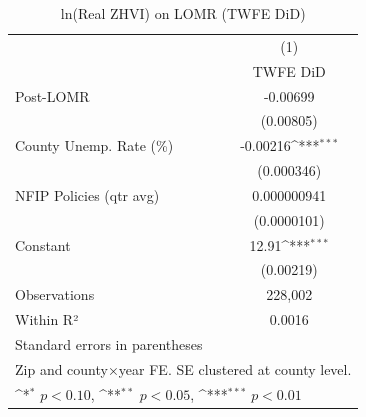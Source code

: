 \begin{table}[htbp]\centering
\def\sym#1{\ifmmode^{#1}\else\(^{#1}\)\fi}
\caption{ln(Real ZHVI) on LOMR (TWFE DiD)}
\begin{tabular}{l*{1}{c}}
\hline\hline
                    &\multicolumn{1}{c}{(1)}\\
                    &\multicolumn{1}{c}{TWFE DiD}\\
\hline
Post-LOMR           &    -0.00699         \\
                    &   (0.00805)         \\
[1em]
County Unemp. Rate (\%)&    -0.00216\sym{***}\\
                    &  (0.000346)         \\
[1em]
NFIP Policies (qtr avg)& 0.000000941         \\
                    & (0.0000101)         \\
[1em]
Constant            &       12.91\sym{***}\\
                    &   (0.00219)         \\
\hline
Observations        &     228,002         \\
Within R²           &      0.0016         \\
\hline\hline
\multicolumn{2}{l}{\footnotesize Standard errors in parentheses}\\
\multicolumn{2}{l}{\footnotesize Zip and county×year FE. SE clustered at county level.}\\
\multicolumn{2}{l}{\footnotesize \sym{*} \(p<0.10\), \sym{**} \(p<0.05\), \sym{***} \(p<0.01\)}\\
\end{tabular}
\end{table}
